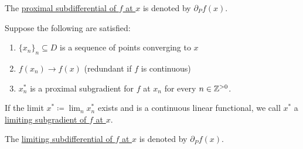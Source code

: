 \begin{definition}
\begin{defenum}
    The \ul{proximal subdifferential of $f$ at $x$} is denoted by $\partial_P f(x)$.

    \item\label{def:subdifferentials/limiting}\cite[definition 11.10]{Clarke2013} Suppose the following are satisfied:
    \begin{enumerate}
      \item $\{ x_n \}_n \subseteq D$ is a sequence of points converging to $x$
      \item $f(x_n) \to f(x)$ (redundant if $f$ is continuous)
      \item $x_n^*$ is a proximal subgradient for $f$ at $x_n$ for every $n \in \mathbb Z^{>0}$.
    \end{enumerate}

    If the limit $x^* \coloneqq \lim_n x_n^*$ exists and is a continuous linear functional, we call $x^*$ a \ul{limiting subgradient of $f$ at $x$}.

    The \ul{limiting subdifferential of $f$ at $x$} is denoted by $\partial_P f(x)$.
  \end{defenum}
\end{definition}
